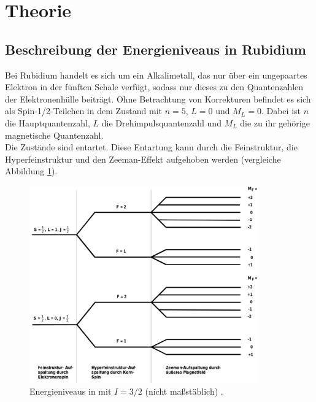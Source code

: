 \section{Theorie}
\label{sec:Theorie}

\subsection{Beschreibung der Energieniveaus in Rubidium}
\label{subsec:energieniveaus}

Bei Rubidium handelt es sich um ein Alkalimetall, das nur über ein ungepaartes Elektron in der fünften Schale verfügt, sodass nur dieses zu den Quantenzahlen der Elektronenhülle beiträgt.
Ohne Betrachtung von Korrekturen befindet es sich als Spin-1/2-Teilchen in dem Zustand mit $n=5$, $L=0$ und $M_L=0$. Dabei ist $n$ die Hauptquantenzahl, $L$ die Drehimpulsquantenzahl und $M_L$ die zu ihr gehörige magnetische Quantenzahl. \\
Die Zustände sind entartet. Diese Entartung kann durch die Feinstruktur, die Hyperfeinstruktur und den Zeeman-Effekt aufgehoben werden (vergleiche Abbildung \ref{fig:energieniveaus}).

\begin{figure}
  	\centering
  	\includegraphics[width=0.88\textwidth,keepaspectratio]{content/images/energieniveaus.png}
  	\caption{Energieniveaus in  mit $I=3/2$ (nicht maßstäblich) \cite{energieniveaus}.}
  	\label{fig:energieniveaus}
\end{figure}

